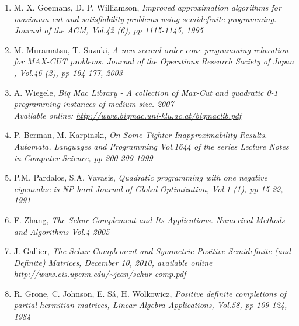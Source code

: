 \documentclass[12pt]{book}
\theoremstyle{definition}
\begin{document}
\begin{enumerate}


\item M. X. Goemans, D. P. Williamson, \it Improved approximation algorithms for maximum cut and satisfiability problems using semidefinite programming. \rm Journal of the ACM, Vol.42 (6), pp 1115-1145, 1995
\label{GoemansWilliamsonMaxCut}
%
\item M. Muramatsu,  T. Suzuki, \it A new second-order cone programming relaxation for MAX-CUT problems. \rm Journal of the Operations Research
Society of Japan , Vol.46 (2), pp 164-177, 2003
\label{MuramatsuSuzukiANewSOCPrelaxForMaxCut}
%
\item A. Wiegele, \it Biq Mac Library - A collection of Max-Cut and
quadratic 0-1 programming instances of medium size. \rm 2007 \\
Available online: \url{http://www.biqmac.uni-klu.ac.at/biqmaclib.pdf}
\label{BiqMacLib}

	








%
\item P. Berman, M. Karpinski, \it On Some Tighter Inapproximability Results. \rm Automata, Languages and Programming
Vol.1644 of the series Lecture Notes in Computer Science, pp 200-209 1999
\label{Inapproximability results}
%
\item P.M. Pardalos, S.A. Vavasis, \it Quadratic programming with one negative eigenvalue is NP-hard \rm Journal of Global Optimization, Vol.1 (1), pp 15-22, 1991
\label{PardalosQPisNPHard}
%
\item F. Zhang, \it The Schur Complement and Its Applications. \rm
Numerical Methods and Algorithms Vol.4 2005
\label{ZhangSchurComplement}
%
\item J. Gallier, \it The Schur Complement and Symmetric Positive Semidefinite (and Definite) Matrices, \rm December 10, 2010, available online \url{http://www.cis.upenn.edu/~jean/schur-comp.pdf}
\label{GallierSchurCompl}
%
\item R. Grone, C. Johnson, E. Sá, H. Wolkowicz, \it Positive definite completions of partial hermitian matrices, \rm 
Linear Algebra Applications, Vol.58, pp 109-124, 1984
\label{GronePSDcompletions}
%


\end{enumerate}
\end{document}
